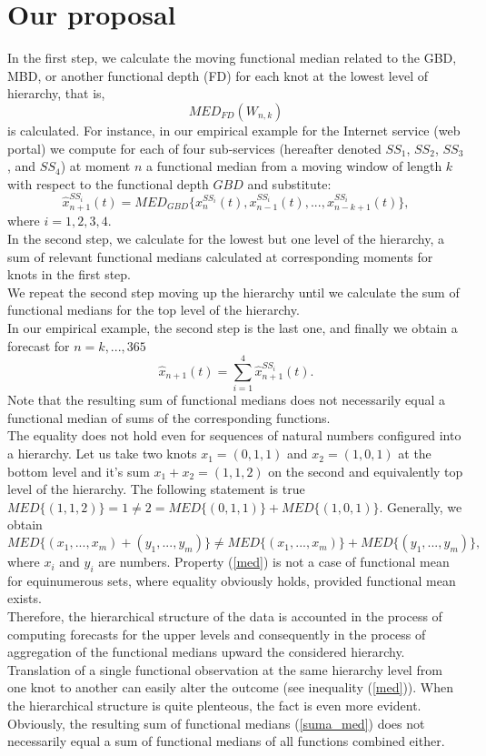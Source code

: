 \documentclass[12pt,a4paper]{article}
\numberwithin{equation}{section}
\begin{document}
\section{Our proposal} 
\label{sec:3}
In the first step, we calculate the moving functional median related to the GBD, MBD, or another functional depth (FD) for each knot at the lowest level of hierarchy, that is, $$MED_{FD}(W_{n,k})$$ is calculated.
For instance, in our empirical example for the Internet service (web portal) we compute for each of four sub-services (hereafter denoted $SS_1$, $SS_2$, $SS_3$, and $SS_4$) at moment $n$ a functional median from a moving window of length $k$ with respect to the functional depth $GBD$ and substitute: $$\hat{x}^{SS_i}_{n+1}(t)=MED_{GBD}\{x^{SS_i}_{n}(t),x^{SS_i}_{n-1}(t),...,x^{SS_i}_{n-k+1}(t)\},$$ where $i=1,2,3,4$.
\\In the second step, we calculate for the lowest but one level of the hierarchy, a sum of relevant functional medians calculated at corresponding moments for knots in the first step.
\\ We repeat the second step moving up the hierarchy until we calculate the sum of functional medians for the top level of the hierarchy.
\\ In our empirical example, the second step is the last one, and finally we obtain a forecast for $n=k,...,365$
\begin{equation}
\hat{x}_{n+1}(t)=\sum_{i=1}^4 \hat{x}^{SS_i}_{n+1}(t).
\label{suma_med}
\end{equation}
Note that the resulting sum of functional medians does not necessarily equal a functional median of sums of the corresponding functions.
\\ The equality does not hold even for sequences of natural numbers configured into a hierarchy. Let us take two knots $x_1=(0,1,1)$ and $x_2=(1,0,1)$ at the bottom level and it's sum $x_1+x_2=(1,1,2)$ on the second and equivalently top level of the hierarchy. The following statement is true\\
$MED\{(1,1,2)\}=1 \neq 2= MED\{(0,1,1)\}+MED\{(1,0,1)\}.$
Generally, we obtain
\begin{equation}
MED\{(x_1,...,x_m)+(y_1,...,y_m)\}\neq MED\{(x_1,...,x_m)\} +MED\{(y_1,...,y_m)\},
\label{med}
\end{equation}
where $x_i$ and $y_i$ are numbers.
Property (\ref{med}) is not a case of functional mean for equinumerous sets, where equality obviously holds, provided functional mean exists. 
\\ Therefore, the hierarchical structure of the data is accounted in the process of computing forecasts for the upper levels and consequently in the process of aggregation of the functional medians upward the considered hierarchy. Translation of a single functional observation at the same hierarchy level from one knot to another can easily alter the outcome (see inequality (\ref{med})). When the hierarchical structure is quite plenteous, the fact is even more evident.
\\ Obviously, the resulting sum of functional medians (\ref{suma_med}) does not necessarily equal a sum of functional medians of all functions combined either.
\end{document}
